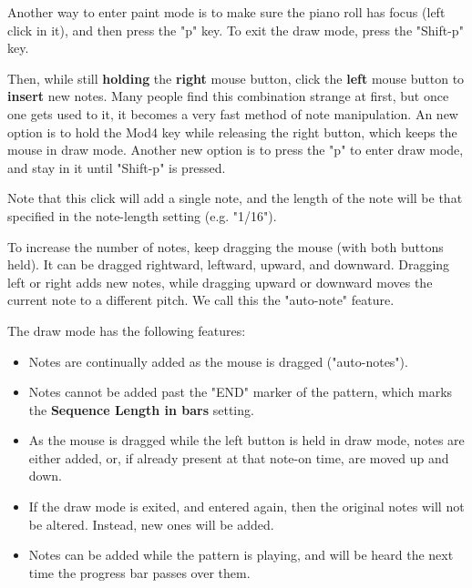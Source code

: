    Another way to enter paint mode is to make sure the piano roll has focus
   (left click in it), and then press the "p" key.
   To exit the draw mode, press the "Shift-p" key.

   Then, while still \textbf{holding} the \textbf{right} mouse button, click
   the \textbf{left} mouse button to \textbf{insert} new notes.  Many people
   find this combination strange at first, but once one gets used to it, it
   becomes a very fast method of note manipulation.  An new option is to
   hold the Mod4 key while releasing the right button, which keeps the mouse
   in draw mode.  Another new option is to press the "p" to enter draw mode,
   and stay in it until "Shift-p" is pressed.

   Note that this click will add a single note, and the length of the note will
   be that specified in the note-length setting (e.g. "1/16").

   To increase the number of notes, keep dragging the mouse (with
   both buttons held).  It can be dragged rightward, leftward, upward, and
   downward.  Dragging left or right adds new notes, while dragging upward or
   downward moves the current note to a different pitch.
   We call this the "auto-note" feature.

   The draw mode has the following features:

   \begin{itemize}
      \item Notes are continually added as the mouse is dragged ("auto-notes").
      \item Notes cannot be added past the "END" marker of the pattern, which
         marks the \textbf{Sequence Length in bars} setting.
      \item As the mouse is dragged while the left button is held in draw mode,
         notes are either added, or, if already present at that note-on time,
         are moved up and down.
      \item If the draw mode is exited, and entered again, then the original
         notes will not be altered.  Instead, new ones will be added.
      \item Notes can be added while the pattern is playing, and will be heard
         the next time the progress bar passes over them.
   \end{itemize}

